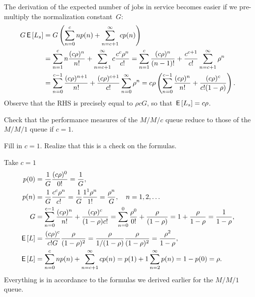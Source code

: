 \documentclass[stochastic-or.tex]{subfiles}
\begin{document}
\begin{extra}
\begin{solution}
The derivation of the expected number of jobs in service becomes easier if we pre-multiply the normalization constant~$G$:
 \begin{align*}
 G \,\mathsf{E}\left[L_s\right]
&= G \left( \sum_{n=0}^{c} n p(n) + \sum_{n=c+1}^{\infty} c p(n) \right) \\
&= \sum_{n=1}^{c} n \frac{(c\rho)^n}{n!} + \sum_{n=c+1}^{\infty} c \frac{c^c\rho^n}{c!}
= \sum_{n=1}^{c} \frac{(c\rho)^n}{(n-1)!} + \frac{c^{c+1}}{c!}\sum_{n=c+1}^{\infty} \rho^n\\
&= \sum_{n=0}^{c-1} \frac{(c\rho)^{n+1}}{n!} + \frac{(c\rho)^{c+1}}{c!}\sum_{n=0}^{\infty} \rho^n
= c\rho \left(\sum_{n=0}^{c-1} \frac{(c\rho)^n}{n!} + \frac{(c\rho)^{c}}{c!(1-\rho)}\right).
 \end{align*}
Observe that the RHS is precisely equal to $\rho c G$, so that $\,\mathsf{E}\left[L_s\right] = c \rho$.
\end{solution}
\end{extra}






\begin{extra}
 Check that the performance measures of the $M/M/c$ queue reduce to those of the $M/M/1$ queue if $c=1$.
\begin{hint}
Fill in $c=1$. Realize that this is a check on the formulas.
\end{hint}
\begin{solution}
Take $c=1$
 \begin{align*}
p(0) &= \frac{1}G \frac{(c\rho)^0}{0!}=\frac1 G, \\
p(n) &= \frac{1}G \frac{c^c\rho^n}{c!} = \frac{1}G \frac{1^1\rho^n}{1!} =\frac{\rho^n}G , \quad n=1,2, \ldots \\
G &=\sum_{n=0}^{c-1} \frac{(c\rho)^n}{n!} + \frac{(c\rho)^c}{(1-\rho)c!}
=\sum_{n=0}^{0} \frac{\rho^0}{0!} + \frac{\rho}{(1-\rho)} = 1 + \frac{\rho}{1-\rho} = \frac1{1-\rho},
\\
\,\mathsf{E}\left[L\right] &= \frac{(c\rho)^c}{c! G}\frac{\rho}{(1-\rho)^2} = \frac{\rho}{1/(1-\rho)}\frac{\rho}{(1-\rho)^2} = \frac{\rho^2}{1-\rho}, \\
\,\mathsf{E}\left[L\right] &= \sum_{n=0}^{c}n p(n) + \sum_{n=c+1}^\infty c p(n) = p(1) + 1 \sum_{n=2}^\infty p(n) = 1- p(0) = \rho.
\end{align*}
Everything is in accordance to the formulas we derived earlier for the $M/M/1$ queue.
\end{solution}
\end{extra}
\end{document}
